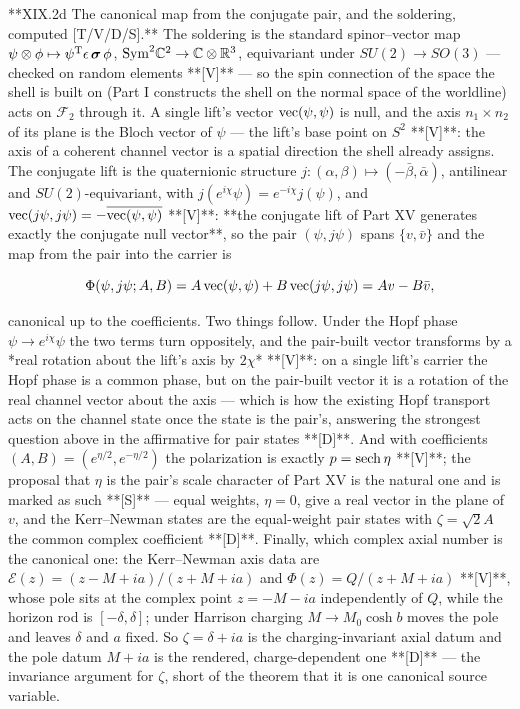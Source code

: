 **XIX.2d The canonical map from the conjugate pair, and the soldering, computed [T/V/D/S].** The soldering is the standard spinor–vector map $\psi\otimes\phi\mapsto\psi^{\rm T}\epsilon\,\boldsymbol\sigma\,\phi$, ${\rm Sym}^2\mathbb C^2\to\mathbb C\otimes\mathbb R^3$, equivariant under $SU(2)\to SO(3)$ — checked on random elements **[V]** — so the spin connection of the space the shell is built on (Part I constructs the shell on the normal space of the worldline) acts on $\mathcal F_2$ through it. A single lift's vector ${\rm vec}(\psi,\psi)$ is null, and the axis $n_1\times n_2$ of its plane is the Bloch vector of $\psi$ — the lift's base point on $S^2$ **[V]**: the axis of a coherent channel vector is a spatial direction the shell already assigns. The conjugate lift is the quaternionic structure $j:(\alpha,\beta)\mapsto(-\bar\beta,\bar\alpha)$, antilinear and $SU(2)$-equivariant, with $j(e^{i\chi}\psi) = e^{-i\chi}j(\psi)$, and ${\rm vec}(j\psi,j\psi) = -\overline{ {\rm vec}(\psi,\psi)}$ **[V]**: **the conjugate lift of Part XV generates exactly the conjugate null vector**, so the pair $(\psi,j\psi)$ spans $\{v,\bar v\}$ and the map from the pair into the carrier is

$$\Phi(\psi,j\psi;A,B) = A\,{\rm vec}(\psi,\psi)+B\,{\rm vec}(j\psi,j\psi) = Av-B\bar v,$$

canonical up to the coefficients. Two things follow. Under the Hopf phase $\psi\to e^{i\chi}\psi$ the two terms turn oppositely, and the pair-built vector transforms by a *real rotation about the lift's axis by $2\chi$* **[V]**: on a single lift's carrier the Hopf phase is a common phase, but on the pair-built vector it is a rotation of the real channel vector about the axis — which is how the existing Hopf transport acts on the channel state once the state is the pair's, answering the strongest question above in the affirmative for pair states **[D]**. And with coefficients $(A,B) = (e^{\eta/2},e^{-\eta/2})$ the polarization is exactly $p = {\rm sech}\,\eta$ **[V]**; the proposal that $\eta$ is the pair's scale character of Part XV is the natural one and is marked as such **[S]** — equal weights, $\eta = 0$, give a real vector in the plane of $v$, and the Kerr–Newman states are the equal-weight pair states with $\zeta = \sqrt2A$ the common complex coefficient **[D]**. Finally, which complex axial number is the canonical one: the Kerr–Newman axis data are $\mathcal E(z) = (z-M+ia)/(z+M+ia)$ and $\Phi(z) = Q/(z+M+ia)$ **[V]**, whose pole sits at the complex point $z = -M-ia$ independently of $Q$, while the horizon rod is $[-\delta,\delta]$; under Harrison charging $M\to M_0\cosh b$ moves the pole and leaves $\delta$ and $a$ fixed. So $\zeta = \delta+ia$ is the charging-invariant axial datum and the pole datum $M+ia$ is the rendered, charge-dependent one **[D]** — the invariance argument for $\zeta$, short of the theorem that it is one canonical source variable.

